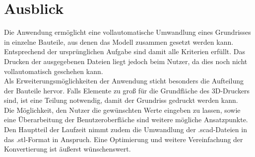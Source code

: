 \chapter{Ausblick}
Die Anwendung ermöglicht eine vollautomatische Umwandlung eines Grundrisses in einzelne Bauteile, aus denen das Modell zusammen gesetzt werden kann.
Entsprechend der ursprünglichen Aufgabe sind damit alle Kriterien erfüllt.
Das Drucken der ausgegebenen Dateien liegt jedoch beim Nutzer, da dies noch nicht vollautomatisch geschehen kann. \\
Als Erweiterungsmöglichkeiten der Anwendung sticht besonders die Aufteilung der Bauteile hervor.
Falls Elemente zu groß für die Grundfläche des 3D-Druckers sind, ist eine Teilung notwendig, damit der Grundriss gedruckt werden kann. \\
Die Möglichkeit, den Nutzer die gewünschten Werte eingeben zu lassen, sowie eine Überarbeitung der Benutzeroberfläche sind weitere mögliche Ansatzpunkte. \\
Den Hauptteil der Laufzeit nimmt zudem die Umwandlung der .scad-Dateien in das .stl-Format in Anspruch.
Eine Optimierung und weitere Vereinfachung der Konvertierung ist äußerst wünschenswert.

